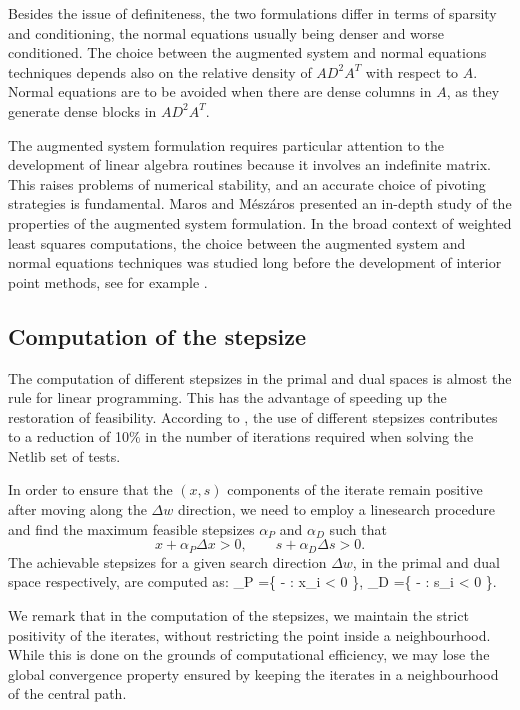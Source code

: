 Besides the issue of definiteness, the two formulations differ in
terms of sparsity and conditioning, the normal equations usually 
being denser and worse conditioned.
The choice between the augmented system and normal equations
techniques depends also on 
the relative density of $AD^2A^T$ with respect to $A$.
Normal equations are to be avoided when there are dense columns in $A$, 
as they generate dense blocks in $AD^2A^T$.

The augmented system formulation requires particular attention 
to the development of linear algebra routines because
it involves an indefinite matrix. This raises problems of numerical
stability, and an accurate choice of pivoting strategies is fundamental.
Maros and M\'esz\'aros \cite{MarosMeszaros} presented an in-depth 
study of the properties of the augmented system formulation.
In the broad context of weighted least squares computations, the choice
between the augmented system and normal equations techniques was studied long
before the development of interior point methods, see for example
\cite{DuffErismanReid86}.

%
%
\subsection{Computation of the stepsize}

The computation of different stepsizes in the primal and dual spaces is
almost the rule for linear programming.
This has the advantage of
speeding up the restoration of feasibility. According to
\cite{GondzioTerlaky}, the use of different stepsizes contributes 
to a reduction of 10\% in the number of iterations required 
when solving the Netlib 
set of tests.

In order to ensure that the $(x,s)$ components of the iterate
remain positive after moving along the
$\Delta w$ direction, we need to employ a linesearch procedure 
and find the maximum feasible stepsizes $\alpha_P$ and $\alpha_D$ 
such that
\[
  x + \alpha_P \Delta x > 0, \qquad  s + \alpha_D \Delta s > 0.
\]
The achievable stepsizes for a given search direction $\Delta w$, 
in the primal and dual space respectively, are computed as:
\be  \label{eq:Alphas}
  \alpha_P =\min \left\{ - : \Delta x_i < 0 \right\},
  \quad\;
  \alpha_D =\min \left\{ - : \Delta s_i < 0 \right\}.
\ee

We remark that in the computation of the stepsizes, we 
maintain the strict positivity of the iterates, without restricting
the point inside a neighbourhood.
While this is done on the grounds of computational efficiency, we may
lose the global convergence property ensured by keeping the
iterates in a neighbourhood of the central path.

